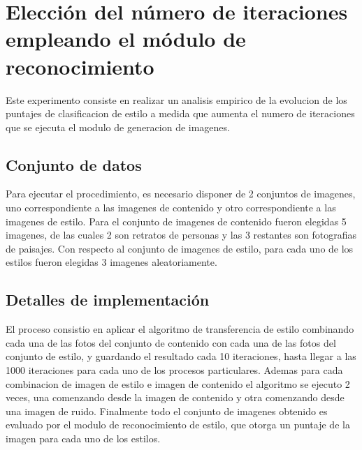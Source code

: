 \documentclass[a4paper,11pt,spanish]{book}
\begin{document}
  \section{Elección del número de iteraciones empleando el módulo de reconocimiento} 
    Este experimento consiste en realizar un analisis empirico de la evolucion de los puntajes de clasificacion de estilo a medida que aumenta el numero de iteraciones
    que se ejecuta el modulo de generacion de imagenes.
    \subsection{Conjunto de datos}
      Para ejecutar el procedimiento, es necesario disponer de 2 conjuntos de imagenes, uno correspondiente a las imagenes de contenido y otro correspondiente a las imagenes de estilo.
      Para el conjunto de imagenes de contenido fueron elegidas 5 imagenes, de las cuales 2 son retratos de personas y las 3 restantes son fotografias de paisajes.
      Con respecto al conjunto de imagenes de estilo, para cada uno de los estilos fueron elegidas 3 imagenes aleatoriamente.
    \subsection{Detalles de implementación}
      El proceso consistio en aplicar el algoritmo de transferencia de estilo combinando cada una de las fotos del conjunto de contenido con cada una de las fotos del conjunto de estilo,
      y guardando el resultado cada 10 iteraciones, hasta llegar a las 1000 iteraciones para cada uno de los procesos particulares.
      Ademas para cada combinacion de imagen de estilo e imagen de contenido el algoritmo se ejecuto 2 veces, una comenzando desde la imagen de contenido y otra comenzando desde una imagen de ruido.
      Finalmente todo el conjunto de imagenes obtenido es evaluado por el modulo de reconocimiento de estilo, que otorga un puntaje de la imagen para cada uno de los estilos.
\end{document}
